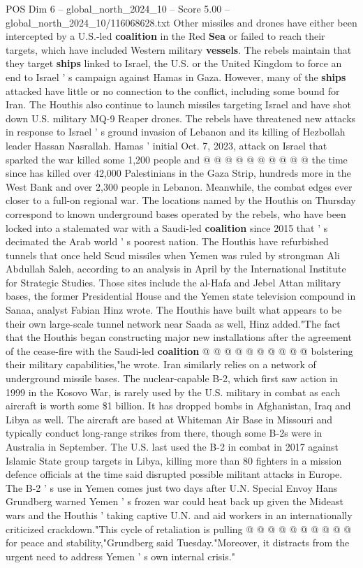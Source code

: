 \begin{textsample}{POS Dim 6 – global\_north\_2024\_10 – Score 5.00 – global\_north\_2024\_10/116068628.txt}
Other missiles and drones have either been intercepted by a U.S.-led \textbf{coalition} in the Red \textbf{Sea} or failed to reach their targets, which have included Western military \textbf{vessels}.
The rebels maintain that they target \textbf{ships} linked to Israel, the U.S. or the United Kingdom to force an end to Israel ' s campaign against Hamas in Gaza.
However, many of the \textbf{ships} attacked have little or no connection to the conflict, including some bound for Iran.
The Houthis also continue to launch missiles targeting Israel and have shot down U.S. military MQ-9 Reaper drones.
The rebels have threatened new attacks in response to Israel ' s ground invasion of Lebanon and its killing of Hezbollah leader Hassan Nasrallah.
Hamas ' initial Oct. 7, 2023, attack on Israel that sparked the war killed some 1,200 people and @ @ @ @ @ @ @ @ @ @ the time since has killed over 42,000 Palestinians in the Gaza Strip, hundreds more in the West Bank and over 2,300 people in Lebanon.
Meanwhile, the combat edges ever closer to a full-on regional war.
The locations named by the Houthis on Thursday correspond to known underground bases operated by the rebels, who have been locked into a stalemated war with a Saudi-led \textbf{coalition} since 2015 that ' s decimated the Arab world ' s poorest nation.
The Houthis have refurbished tunnels that once held Scud missiles when Yemen was ruled by strongman Ali Abdullah Saleh, according to an analysis in April by the International Institute for Strategic Studies.
Those sites include the al-Hafa and Jebel Attan military bases, the former Presidential House and the Yemen state television compound in Sanaa, analyst Fabian Hinz wrote.
The Houthis have built what appears to be their own large-scale tunnel network near Saada as well, Hinz added."The fact that the Houthis began constructing major new installations after the agreement of the cease-fire with the Saudi-led \textbf{coalition} @ @ @ @ @ @ @ @ @ @ bolstering their military capabilities,"he wrote.
Iran similarly relies on a network of underground missile bases.
The nuclear-capable B-2, which first saw action in 1999 in the Kosovo War, is rarely used by the U.S. military in combat as each aircraft is worth some \$1 billion.
It has dropped bombs in Afghanistan, Iraq and Libya as well.
The aircraft are based at Whiteman Air Base in Missouri and typically conduct long-range strikes from there, though some B-2s were in Australia in September.
The U.S. last used the B-2 in combat in 2017 against Islamic State group targets in Libya, killing more than 80 fighters in a mission defence officials at the time said disrupted possible militant attacks in Europe.
The B-2 ' s use in Yemen comes just two days after U.N.
Special Envoy Hans Grundberg warned Yemen ' s frozen war could heat back up given the Mideast wars and the Houthis ' taking captive U.N. and aid workers in an internationally criticized crackdown."This cycle of retaliation is pulling @ @ @ @ @ @ @ @ @ @ for peace and stability,"Grundberg said Tuesday."Moreover, it distracts from the urgent need to address Yemen ' s own internal crisis."

\end{textsample}
